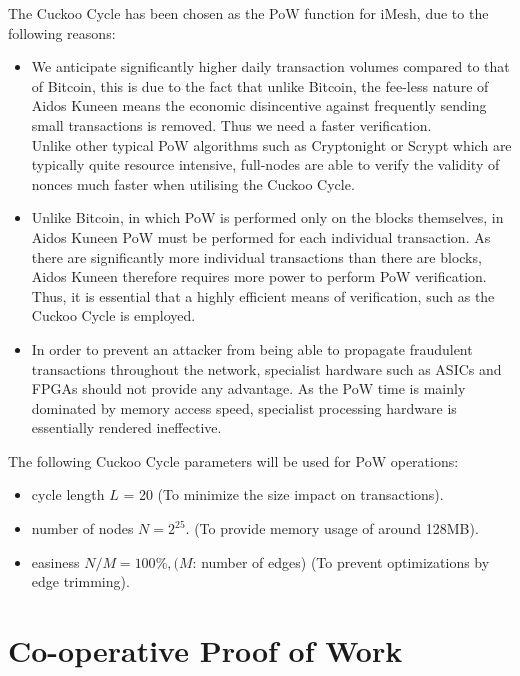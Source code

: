 \documentclass[a4paper,10pt,twocolumn]{article}
\begin{document}
The Cuckoo Cycle has been chosen as the PoW function for iMesh, due to the following reasons:

\begin{itemize}
	\item We anticipate significantly higher daily transaction volumes compared to that of Bitcoin, this is due to the fact that unlike Bitcoin, the fee-less nature of Aidos Kuneen means the economic disincentive against frequently sending small transactions is removed. Thus we need a faster verification. \\
Unlike other typical PoW algorithms such as Cryptonight or Scrypt which are typically quite resource intensive, full-nodes are able to verify the validity of nonces much faster when utilising the Cuckoo Cycle. 

\item Unlike Bitcoin, in which PoW is performed only on the blocks themselves, in Aidos Kuneen PoW must be performed for each individual transaction. As there are significantly more individual transactions than there are blocks, Aidos Kuneen therefore requires more power to perform PoW verification. Thus, it is essential that a highly efficient means of verification, such as the Cuckoo Cycle is employed.

\item In order to prevent an attacker from being able to propagate fraudulent transactions throughout the network, specialist hardware such as ASICs and FPGAs should not provide any advantage. As the PoW time is mainly dominated by memory access speed, specialist processing hardware is essentially rendered ineffective.
\end{itemize}

The following Cuckoo Cycle parameters will be used for PoW operations:

\begin{itemize}
	\item cycle length \( L\) = 20 (To minimize the size impact on transactions).
    \item number of nodes \( N = 2^{25} \). (To provide memory usage of around 128MB\@).
    \item easiness \(N/M = 100\% , (M\): number of edges) (To prevent optimizations by edge trimming).
\end{itemize}

\section{Co-operative Proof of Work}
\label{sec:coPoW}
\end{document}
